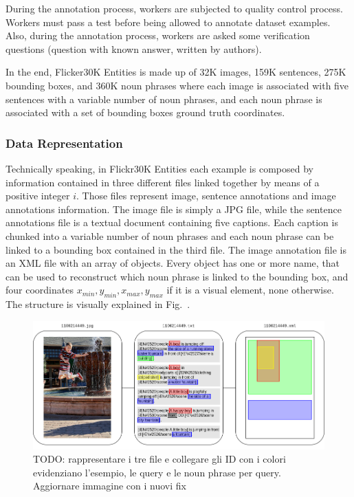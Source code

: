 During the annotation process, workers are subjected to quality
control process. Workers must pass a test before being allowed to
annotate dataset examples. Also, during the annotation process,
workers are asked some verification questions (question with known
answer, written by authors).

In the end, Flicker30K Entities is made up of 32K images, 159K
sentences, 275K bounding boxes, and 360K noun phrases where each image
is associated with five sentences with a variable number of noun
phrases, and each noun phrase is associated with a set of bounding
boxes ground truth coordinates. 

\subsubsection{Data Representation}
\label{subsec:flickr30k-data-representation}

Technically speaking, in Flickr30K Entities each example is composed
by information contained in three different files linked together by
means of a positive integer $i$. Those files represent image, sentence
annotations and image annotations information. The image file is
simply a JPG file, while the sentence annotations file is a textual
document containing five captions. Each caption is chunked into a
variable number of noun phrases and each noun phrase can be linked to
a bounding box contained in the third file. The image annotation file
is an XML file with an array of objects. Every object has one or more
name, that can be used to reconstruct which noun phrase is linked to
the bounding box, and four coordinates $x_{min}, y_{min}, x_{max},
y_{max}$ if it is a visual element, none otherwise. The structure is
visually explained in
Fig.~.

\begin{figure}
  \includegraphics[width=\textwidth]{figures/flickr30k-document-specification.png}
  \caption[TODO]{TODO: rappresentare i tre file e collegare gli ID con i colori evidenziano l'esempio, le query e le noun phrase per query. Aggiornare immagine con i nuovi fix}
  \label{fig:flickr30k-technical-data-representation}
\end{figure}

